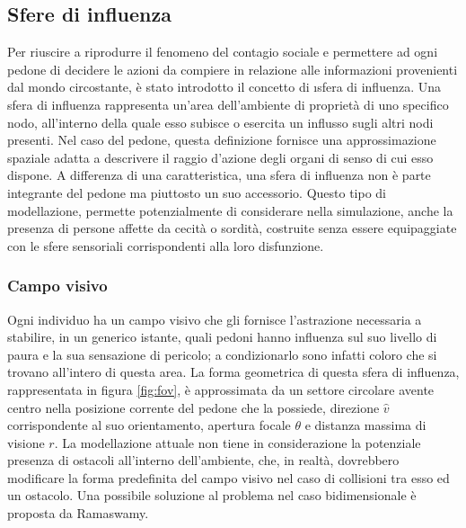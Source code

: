 \subsection{Sfere di influenza}
Per riuscire a riprodurre il fenomeno del contagio sociale e permettere ad ogni pedone di decidere le azioni da compiere in relazione alle informazioni provenienti dal mondo circostante, è stato introdotto il concetto di \i{sfera di influenza}. \newline
Una sfera di influenza rappresenta un'area dell'ambiente di proprietà di uno specifico nodo, all'interno della quale esso subisce o esercita un influsso sugli altri nodi presenti. Nel caso del pedone, questa definizione fornisce una approssimazione spaziale adatta a descrivere il raggio d'azione degli organi di senso di cui esso dispone. \newline
A differenza di una caratteristica, una sfera di influenza non è parte integrante del pedone ma piuttosto un suo accessorio. Questo tipo di modellazione, permette potenzialmente di considerare nella simulazione, anche la presenza di persone affette da cecità o sordità, costruite senza essere equipaggiate con le sfere sensoriali corrispondenti alla loro disfunzione.

\subsubsection{Campo visivo}
Ogni individuo ha un campo visivo che gli fornisce l'astrazione necessaria a stabilire, in un generico istante, quali pedoni hanno influenza sul suo livello di paura e la sua sensazione di pericolo; a condizionarlo sono infatti coloro che si trovano all'intero di questa area.\newline
La forma geometrica di questa sfera di influenza, rappresentata in figura \ref{fig:fov}, è approssimata da un settore circolare avente centro nella posizione corrente del pedone che la possiede, direzione $\hat{v}$ corrispondente al suo orientamento, apertura focale $\theta$ e distanza massima di visione $r$. \newline
La modellazione attuale non tiene in considerazione la potenziale presenza di ostacoli all'interno dell'ambiente, che, in realtà, dovrebbero modificare la forma predefinita del campo visivo nel caso di collisioni tra esso ed un ostacolo. Una possibile soluzione al problema nel caso bidimensionale è proposta da Ramaswamy.

